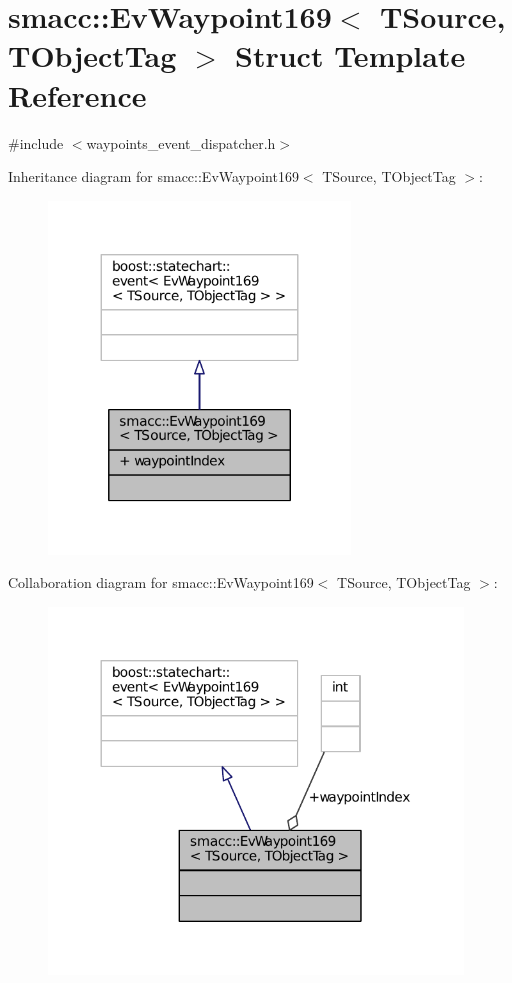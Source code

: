 \hypertarget{structsmacc_1_1EvWaypoint169}{}\section{smacc\+:\+:Ev\+Waypoint169$<$ T\+Source, T\+Object\+Tag $>$ Struct Template Reference}
\label{structsmacc_1_1EvWaypoint169}


{\ttfamily \#include $<$waypoints\+\_\+event\+\_\+dispatcher.\+h$>$}



Inheritance diagram for smacc\+:\+:Ev\+Waypoint169$<$ T\+Source, T\+Object\+Tag $>$\+:
\nopagebreak
\begin{figure}[H]
\begin{center}
\leavevmode
\includegraphics[width=227pt]{structsmacc_1_1EvWaypoint169__inherit__graph}
\end{center}
\end{figure}


Collaboration diagram for smacc\+:\+:Ev\+Waypoint169$<$ T\+Source, T\+Object\+Tag $>$\+:
\nopagebreak
\begin{figure}[H]
\begin{center}
\leavevmode
\includegraphics[width=312pt]{structsmacc_1_1EvWaypoint169__coll__graph}
\end{center}
\end{figure}
